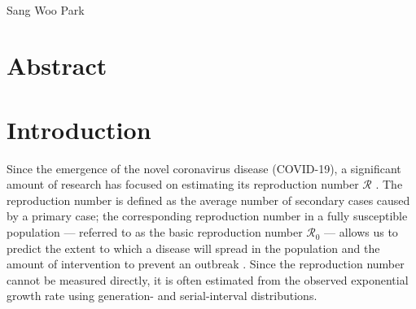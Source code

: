 \documentclass[12pt]{article}
\date{\today}
\begin{document}
\begin{flushleft}{
	\Large
	\textbf{}
}
\newline\\
Sang Woo Park
\end{flushleft}

\section*{Abstract}

\pagebreak


\section{Introduction}

Since the emergence of the novel coronavirus disease (COVID-19), a significant amount of research has focused on estimating its reproduction number $\mathcal R$ \citep{majumder2020early}.
The reproduction number is defined as the average number of secondary cases caused by a primary case;
the corresponding reproduction number in a fully susceptible population --- referred to as the basic reproduction number $\mathcal R_0$ --- allows us to predict the extent to which a disease will spread in the population and the amount of intervention to prevent an outbreak \citep{anderson1991infectious}.
Since the reproduction number cannot be measured directly, it is often estimated from the observed exponential growth rate using generation- and serial-interval distributions.
\end{document}
